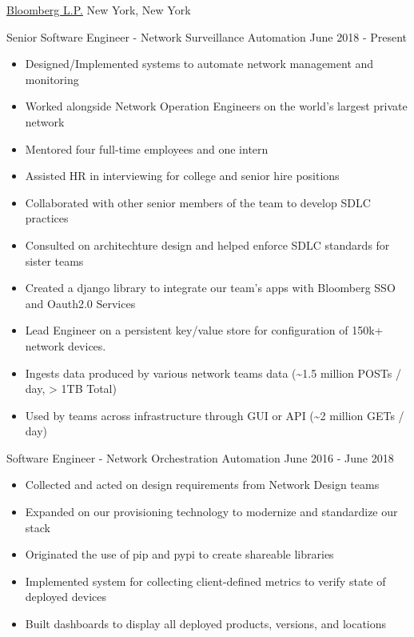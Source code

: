 \documentclass[11pt]{article}
\begin{document}
\headedsection  %
{\href{http://www.bloomberg.com/company}{Bloomberg L.P.}}
{New York, New York}
{
    \headedsubsection
    {Senior Software Engineer - Network Surveillance Automation}
    {June 2018 - Present}
    {
        \begin{itemize}
            \item Designed/Implemented systems to automate network management and monitoring
            \item Worked alongside Network Operation Engineers on the world's largest private network
            \item Mentored four full-time employees and one intern
            \item Assisted HR in interviewing for college and senior hire positions
            \item Collaborated with other senior members of the team to develop SDLC practices
            \item Consulted on architechture design and helped enforce SDLC standards for sister teams
            \item Created a django library to integrate our team's apps with Bloomberg SSO and Oauth2.0 Services
            \item Lead Engineer on a persistent key/value store for configuration of 150k+ network devices. 
            \item[] \nobreakhspace{1.5em}Ingests data produced by various network teams data (\textasciitilde{}1.5 million POSTs / day, > 1TB Total)
            \item[] \nobreakhspace{1.5em}Used by teams across infrastructure through GUI or API (\textasciitilde{}2 million GETs / day)
        \end{itemize}

    }
    \headedsubsection
    {Software Engineer - Network Orchestration Automation}
    {June 2016 - June 2018}
    {
        \begin{itemize}
            \item Collected and acted on design requirements from Network Design teams
            \item Expanded on our provisioning technology to modernize and standardize our stack
            \item Originated the use of pip and pypi to create shareable libraries
            \item Implemented system for collecting client-defined metrics to verify state of deployed devices
            \item Built dashboards to display all deployed products, versions, and locations
        \end{itemize}

}}
\end{document}
